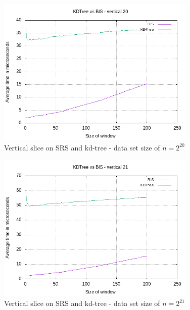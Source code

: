 \begin{figure}[h]
    \centering
    \includegraphics[width = 0.85\textwidth]{pictures/analysis/smalls/vert_20.png}
    \caption{Vertical slice on SRS and kd-tree - data set size of $n=2^{20}$}\label{fig:small_vert_20}
\end{figure}

\begin{figure}[h]
    \centering
    \includegraphics[width = 0.85\textwidth]{pictures/analysis/smalls/vert_21.png}
    \caption{Vertical slice on SRS and kd-tree - data set size of $n=2^{21}$}\label{fig:small_vert_21}
\end{figure}

